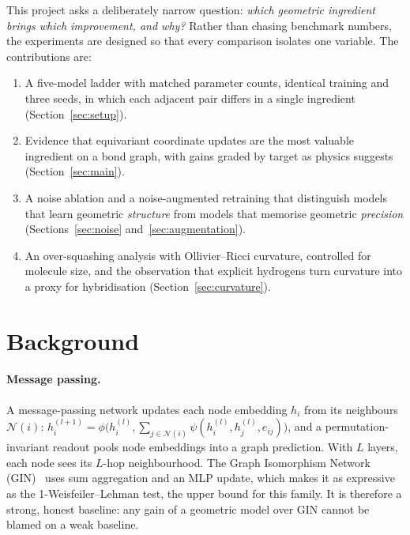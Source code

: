 \documentclass[11pt,a4paper]{article}
\begin{document}
This project asks a deliberately narrow question: \emph{which geometric ingredient brings
which improvement, and why?} Rather than chasing benchmark numbers, the experiments are
designed so that every comparison isolates one variable. The contributions are:
\begin{enumerate}
  \item A five-model ladder with matched parameter counts, identical training and three
        seeds, in which each adjacent pair differs in a single ingredient (Section~\ref{sec:setup}).
  \item Evidence that equivariant coordinate updates are the most valuable ingredient on a
        bond graph, with gains graded by target as physics suggests (Section~\ref{sec:main}).
  \item A noise ablation and a noise-augmented retraining that distinguish models that learn
        geometric \emph{structure} from models that memorise geometric \emph{precision}
        (Sections~\ref{sec:noise} and~\ref{sec:augmentation}).
  \item An over-squashing analysis with Ollivier--Ricci curvature, controlled for molecule
        size, and the observation that explicit hydrogens turn curvature into a proxy for
        hybridisation (Section~\ref{sec:curvature}).
\end{enumerate}

\section{Background}

\paragraph{Message passing.} A message-passing network updates each node embedding $h_i$
from its neighbours $\mathcal{N}(i)$:
$h_i^{(l+1)} = \phi\big(h_i^{(l)}, \textstyle\sum_{j\in\mathcal{N}(i)} \psi(h_i^{(l)}, h_j^{(l)}, e_{ij})\big)$,
and a permutation-invariant readout pools node embeddings into a graph prediction. With $L$
layers, each node sees its $L$-hop neighbourhood. The Graph Isomorphism Network
(GIN)~\cite{xu2019} uses sum aggregation and an MLP update, which makes it as expressive as
the 1-Weisfeiler--Lehman test, the upper bound for this family. It is therefore a strong,
honest baseline: any gain of a geometric model over GIN cannot be blamed on a weak baseline.
\end{document}
